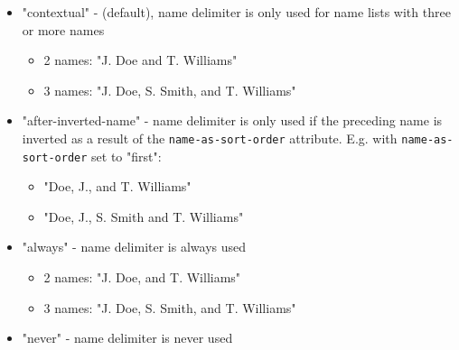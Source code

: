 \begin{description}
\begin{itemize}
\tightlist
\item
  "contextual" - (default), name delimiter is only used for name lists
  with three or more names

  \begin{itemize}
  \tightlist
  \item
    2 names: "J. Doe and T. Williams"
  \item
    3 names: "J. Doe, S. Smith, and T. Williams"
  \end{itemize}
\item
  "after-inverted-name" - name delimiter is only used if the preceding
  name is inverted as a result of the \texttt{name-as-sort-order}
  attribute. E.g. with \texttt{name-as-sort-order} set to "first":

  \begin{itemize}
  \tightlist
  \item
    "Doe, J., and T. Williams"
  \item
    "Doe, J., S. Smith and T. Williams"
  \end{itemize}
\item
  "always" - name delimiter is always used

  \begin{itemize}
  \tightlist
  \item
    2 names: "J. Doe, and T. Williams"
  \item
    3 names: "J. Doe, S. Smith, and T. Williams"
  \end{itemize}
\item
  "never" - name delimiter is never used


\end{itemize}
\end{description}
